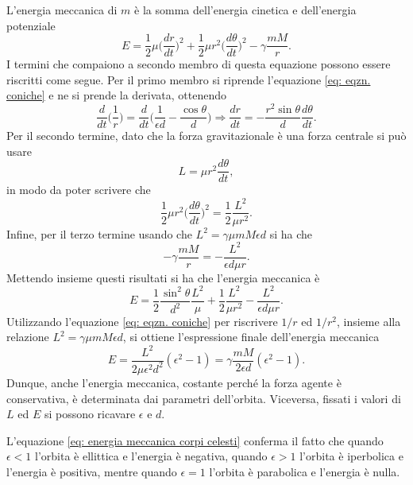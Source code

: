 L'energia meccanica di $m$ è la somma dell'energia cinetica e dell'energia potenziale
\begin{equation}
    E=\frac{1}{2}\mu\bigg(\frac{dr}{dt}\bigg)^2+\frac{1}{2}\mu r^2\bigg(\frac{d\theta}{dt}\bigg)^2-\gamma\frac{mM}{r}. 
\end{equation}
I termini che compaiono a secondo membro di questa equazione possono essere riscritti come segue. Per il primo membro si riprende l'equazione \eqref{eq: eqzn. coniche} e ne si prende la derivata, ottenendo
\begin{equation}
    \frac{d}{dt}\bigg(\frac{1}{r}\bigg)=\frac{d}{dt}\bigg(\frac{1}{\epsilon d}-\frac{\cos\theta}{d}\bigg)\Rightarrow\frac{dr}{dt}=-\frac{r^2\sin\theta}{d}\frac{d\theta}{dt}.
\end{equation}
Per il secondo termine, dato che la forza gravitazionale è una forza centrale si può usare 
\begin{equation}
    L=\mu r^2\frac{d\theta}{dt},
\end{equation}
in modo da poter scrivere che
\begin{equation}
    \frac{1}{2}\mu r^2\bigg(\frac{d\theta}{dt}\bigg)^2=\frac{1}{2}\frac{L^2}{\mu r^2}.
\end{equation}
Infine, per il terzo termine usando che $L^2=\gamma\mu mM\epsilon d$ si ha che
\begin{equation}
    -\gamma\frac{mM}{r}=-\frac{L^2}{\epsilon d\mu r}.
\end{equation}
Mettendo insieme questi risultati si ha che l'energia meccanica è
\begin{equation}
    E=\frac{1}{2}\frac{\sin^2\theta}{d^2}\frac{L^2}{\mu}+\frac{1}{2}\frac{L^2}{\mu r^2}-\frac{L^2}{\epsilon d\mu r}.
\end{equation}
Utilizzando l'equazione \eqref{eq: eqzn. coniche} per riscrivere $1/r$ ed $1/r^2$, insieme alla relazione $L^2=\gamma\mu mM\epsilon d$, si ottiene l'espressione finale dell'energia meccanica
\begin{equation}
\label{eq: energia meccanica corpi celesti}
    E=\frac{L^2}{2\mu\epsilon^2 d^2}(\epsilon^2-1)=\gamma\frac{mM}{2\epsilon d}(\epsilon^2-1).
\end{equation}
Dunque, anche l'energia meccanica, costante perché la forza agente è conservativa, è determinata dai parametri dell'orbita. Viceversa, fissati i valori di $L$ ed $E$ si possono ricavare $\epsilon$ e $d$. 
\begin{obs}
    L'equazione \eqref{eq: energia meccanica corpi celesti} conferma il fatto che quando $\epsilon<1$ l'orbita è ellittica e l'energia è negativa, quando $\epsilon>1$ l'orbita è iperbolica e l'energia è positiva, mentre quando $\epsilon=1$ l'orbita è parabolica e l'energia è nulla.
\end{obs}
